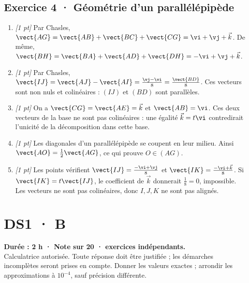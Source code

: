 \subsection*{Exercice 4 · Géométrie d'un parallélépipède}\begin{enumerate}

\item \textit{[1 pt]} Par Chasles, $\vect{AG}=\vect{AB}+\vect{BC}+\vect{CG}=\vi +\vj +\vec k$. De même, $\vect{BH}=\vect{BA}+\vect{AD}+\vect{DH}=-\vi +\vj +\vec k$.

\item \textit{[1 pt]} Par Chasles, $\vect{IJ}=\vect{AJ}-\vect{AI}=\frac{\vj -\vi }{8}=\frac{\vect{BD}}{8}$. Ces vecteurs sont non nuls et colinéaires : $(IJ)$ et $(BD)$ sont parallèles.

\item \textit{[1 pt]} On a $\vect{CG}=\vect{AE}=\vec k$ et $\vect{AB}=\vi $. Ces deux vecteurs de la base ne sont pas colinéaires : une égalité $\vec k=t\vi $ contredirait l'unicité de la décomposition dans cette base.

\item \textit{[1 pt]} Les diagonales d'un parallélépipède se coupent en leur milieu. Ainsi $\vect{AO}=\frac12\vect{AG}$, ce qui prouve $O\in(AG)$.

\item \textit{[1 pt]} Les points vérifient $\vect{IJ}=\frac{-\vi +\vj }{8}$ et $\vect{IK}=\frac{-\vi +\vec k}{8}$. Si $\vect{IK}=t\vect{IJ}$, le coefficient de $\vec k$ donnerait $\frac{1}{8}=0$, impossible. Les vecteurs ne sont pas colinéaires, donc $I,J,K$ ne sont pas alignés.

\end{enumerate}

\fi

\fi

\ifmxteacher

\mxnewpage{}\label{sujet:1-4}

\section*{DS1 · B}


\textbf{Durée : 2 h · Note sur 20 ·  exercices indépendants.}\\Calculatrice autorisée. Toute réponse doit être justifiée ; les démarches incomplètes seront prises en compte. Donner les valeurs exactes ; arrondir les approximations à $10^{-4}$, sauf précision différente.

